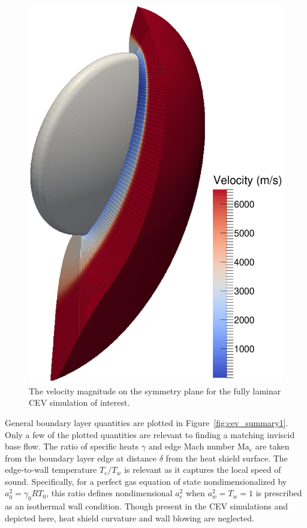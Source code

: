 \documentclass[letterpaper,11pt,nointlimits,reqno]{amsart}
\newcommand{\Mach}[1][]{\mbox{Ma}_{#1}}
\begin{document}
\begin{figure}[p]
  \centering
  \includegraphics[height=0.92\textheight]{symplanenorm}
  \caption{
    \label{fig:cev_symplane}
    The velocity magnitude on the symmetry plane for the fully laminar
    CEV simulation of interest.
  }
\end{figure}

General boundary layer quantities are plotted in Figure~\ref{fig:cev_summary1}.
Only a few of the plotted quantities are relevant to finding a matching
inviscid base flow.  The ratio of specific heats $\gamma$ and edge Mach number
$\Mach[e]{}$ are taken from the boundary layer edge at distance $\delta$ from
the heat shield surface.  The edge-to-wall temperature $T_e/T_w$ is relevant as
it captures the local speed of sound.  Specifically, for a perfect gas equation
of state nondimensionalized by $a_0^2=\gamma_{0}RT_0$, this ratio defines
nondimensional $a_e^2$ when $a_w^2=T_w=1$ is prescribed as an isothermal wall
condition.  Though present in the CEV simulations and depicted here, heat
shield curvature and wall blowing are neglected.
\end{document}
